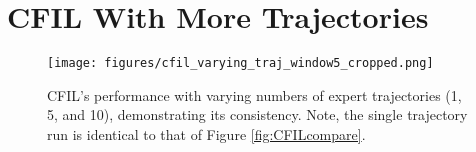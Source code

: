 \section{CFIL With More Trajectories}\label{appendix:CFIL_varying_traj}

\begin{figure}[H]
\vskip 0.1in
\centering
\texttt{[image: figures/cfil\_varying\_traj\_window5\_cropped.png]}
\caption{CFIL's performance with varying numbers of expert trajectories (1, 5, and 10), demonstrating its consistency. Note, the single trajectory run is identical to that of Figure \ref{fig:CFILcompare}.}
\label{fig:CFIL_more_traj}
\vskip -0.1in
\end{figure}